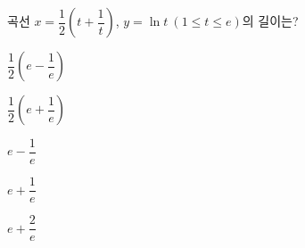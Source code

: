 \hspace*{2mm}\begin{minipage}[t]{\dimexpr\linewidth-2mm\relax}\vspace{0pt}
곡선 $x=\dfrac{1}{2}\left(t+\dfrac{1}{t}\right)$, $y=\ln t\ (1\le t\le e)$의 길이는?
\begin{choices32}{\rule[-3ex]{0pt}{8ex}$\dfrac{1}{2}\left(e-\dfrac{1}{e}\right)$}{\rule[-3ex]{0pt}{8ex}$\dfrac{1}{2}\left(e+\dfrac{1}{e}\right)$}{\rule[-3ex]{0pt}{8ex}$e-\dfrac{1}{e}$}{\rule[-3ex]{0pt}{8ex}$e+\dfrac{1}{e}$}{\rule[-3ex]{0pt}{8ex}$e+\dfrac{2}{e}$}\end{choices32}\end{minipage}
